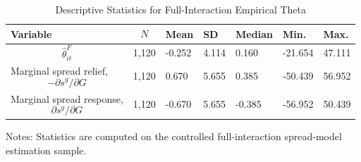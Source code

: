 \begin{table}[H]\centering
\begin{threeparttable}
\caption{Descriptive Statistics for Full-Interaction Empirical Theta}
\label{tab:theta_descriptive_stats}
\scriptsize
\begin{tabularx}{\textwidth}{lYYYYYY}
\toprule
Variable & $$N$$ & Mean & SD & Median & Min. & Max. \\
\midrule
$$\widehat{\theta}^{F}_{it}$$ & 1,120 & -0.252 & 4.114 & 0.160 & -21.654 & 47.111 \\
Marginal spread relief, $$-\partial s^g/\partial G$$ & 1,120 & 0.670 & 5.655 & 0.385 & -50.439 & 56.952 \\
Marginal spread response, $$\partial s^g/\partial G$$ & 1,120 & -0.670 & 5.655 & -0.385 & -56.952 & 50.439 \\
\bottomrule
\end{tabularx}
\begin{tablenotes}[flushleft]\footnotesize
\item Notes: Statistics are computed on the controlled full-interaction spread-model estimation sample.
\end{tablenotes}
\end{threeparttable}
\end{table}
